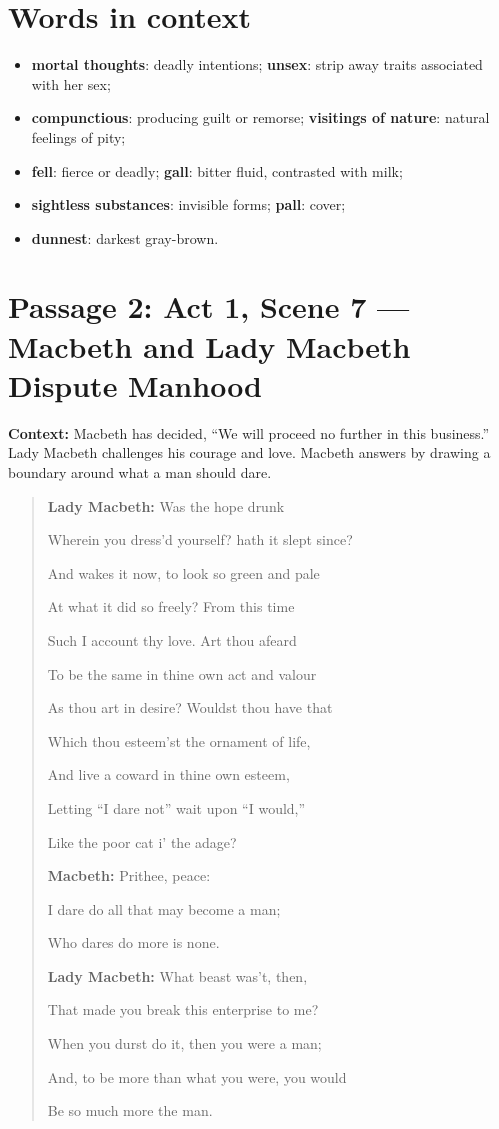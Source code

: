 \documentclass[11pt]{article}
\newenvironment{playpassage}{\begin{quote}\small\setlength{\parskip}{0.05em}\setlength{\parindent}{0pt}}{\end{quote}}
\newcommand{\speaker}[1]{\textbf{#1:}}
\begin{document}
\section*{Words in context}
\begin{itemize}
\item \textbf{mortal thoughts}: deadly intentions; \textbf{unsex}: strip away traits associated with her sex;
\item \textbf{compunctious}: producing guilt or remorse; \textbf{visitings of nature}: natural feelings of pity;
\item \textbf{fell}: fierce or deadly; \textbf{gall}: bitter fluid, contrasted with milk;
\item \textbf{sightless substances}: invisible forms; \textbf{pall}: cover;
\item \textbf{dunnest}: darkest gray-brown.
\end{itemize}

\newpage
\section*{Passage 2: Act 1, Scene 7 --- Macbeth and Lady Macbeth Dispute Manhood}
\textbf{Context:} Macbeth has decided, ``We will proceed no further in this business.'' Lady Macbeth challenges his courage and love. Macbeth answers by drawing a boundary around what a man should dare.
\begin{playpassage}
\speaker{Lady Macbeth} Was the hope drunk\par
Wherein you dress'd yourself? hath it slept since?\par
And wakes it now, to look so green and pale\par
At what it did so freely? From this time\par
Such I account thy love. Art thou afeard\par
To be the same in thine own act and valour\par
As thou art in desire? Wouldst thou have that\par
Which thou esteem'st the ornament of life,\par
And live a coward in thine own esteem,\par
Letting ``I dare not'' wait upon ``I would,''\par
Like the poor cat i' the adage?

\speaker{Macbeth} Prithee, peace:\par
I dare do all that may become a man;\par
Who dares do more is none.

\speaker{Lady Macbeth} What beast was't, then,\par
That made you break this enterprise to me?\par
When you durst do it, then you were a man;\par
And, to be more than what you were, you would\par
Be so much more the man.
\end{playpassage}
\end{document}

